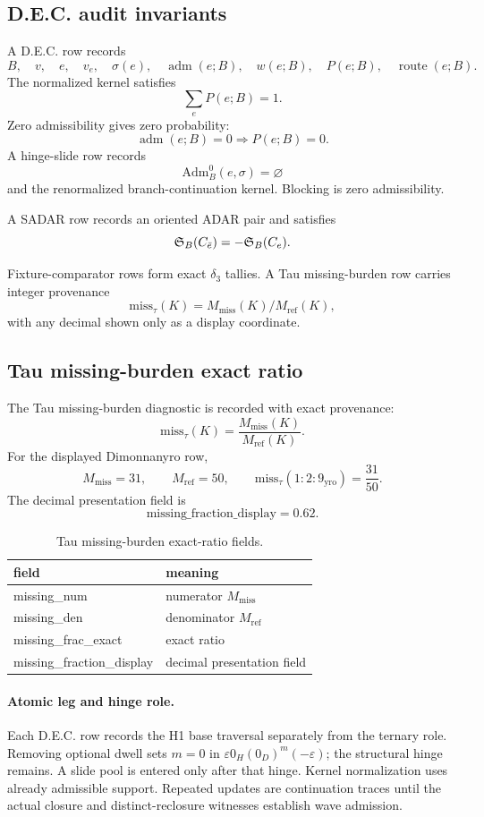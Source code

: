 \subsection{D.E.C. audit invariants}\label{manual:dec-ledger:audit-hooks}
A D.E.C. row records
\[
B,
\quad
v,
\quad
e,
\quad
v_e,
\quad
\sigma(e),
\quad
\operatorname{adm}(e;B),
\quad
w(e;B),
\quad
P(e;B),
\quad
\operatorname{route}(e;B).
\]
The normalized kernel satisfies
\[
\sum_e P(e;B)=1.
\]
Zero admissibility gives zero probability:
\[
\operatorname{adm}(e;B)=0\Rightarrow P(e;B)=0.
\]
A hinge-slide row records
\[
\mathrm{Adm}^0_B(e,\sigma)=\varnothing
\]
and the renormalized branch-continuation kernel. Blocking is zero admissibility.

A SADAR row records an oriented ADAR pair and satisfies
\[
\mathfrak S_B(C_{\bar e})=-\mathfrak S_B(C_e).
\]

Fixture-comparator rows form exact \(\delta_3\) tallies. A Tau missing-burden row carries integer provenance
\[
\mathrm{miss}_\tau(K)=M_{\mathrm{miss}}(K)/M_{\mathrm{ref}}(K),
\]
with any decimal shown only as a display coordinate.

\subsection{Tau missing-burden exact ratio}\label{manual:dec-ledger:tau-ratio}
The Tau missing-burden diagnostic is recorded with exact provenance:
\[
\mathrm{miss}_\tau(K)=\frac{M_{\mathrm{miss}}(K)}{M_{\mathrm{ref}}(K)}.
\]
For the displayed Dimonnanyro row,
\[
M_{\mathrm{miss}}=31,
\qquad
M_{\mathrm{ref}}=50,
\qquad
\mathrm{miss}_\tau(1{:}2{:}9_{\mathrm{yro}})=\frac{31}{50}.
\]
The decimal presentation field is
\[
\mathrm{missing\_fraction\_display}=0.62.
\]
\begin{table}[H]
\centering
\scriptsize
\caption{Tau missing-burden exact-ratio fields.}
\begin{tabular}{l l}
\toprule
field & meaning\\
\midrule
missing\_num & numerator $M_{\mathrm{miss}}$\\
missing\_den & denominator $M_{\mathrm{ref}}$\\
missing\_frac\_exact & exact ratio\\
missing\_fraction\_display & decimal presentation field\\
\bottomrule
\end{tabular}
\label{tab:manual-dec-tau-missing-ratio-fields}
\end{table}

\paragraph{Atomic leg and hinge role.}
Each D.E.C. row records the H1 base traversal separately from the ternary role.
Removing optional dwell sets \(m=0\) in \(\varepsilon0_H(0_D)^m(-\varepsilon)\);
the structural hinge remains. A slide pool is entered only after that hinge.
Kernel normalization uses already admissible support. Repeated updates are
continuation traces until the actual closure and distinct-reclosure witnesses
establish wave admission.
